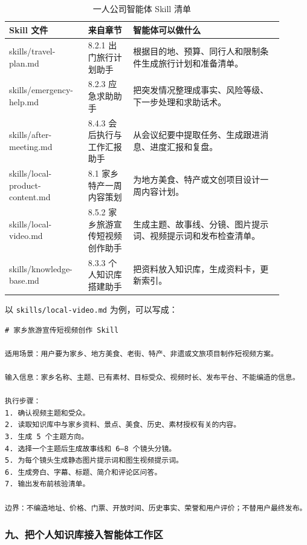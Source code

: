 \begin{table}[H]
\centering
\caption{一人公司智能体 Skill 清单}
\label{tab:oneperson-skill-list}
\begin{tabular}{p{0.25\linewidth} p{0.15\linewidth} p{0.50\linewidth}}
\toprule
\textbf{Skill 文件} & \textbf{来自章节} & \textbf{智能体可以做什么} \\
\midrule
skills/travel-plan.md & 8.2.1 出门旅行计划助手 & 根据目的地、预算、同行人和限制条件生成旅行计划和准备清单。 \\
skills/emergency-help.md & 8.2.3 应急求助助手 & 把突发情况整理成事实、风险等级、下一步处理和求助话术。 \\
skills/after-meeting.md & 8.4.3 会后执行与工作汇报助手 & 从会议纪要中提取任务、生成跟进消息、进度汇报和复盘。 \\
skills/local-product-content.md & 8.1 家乡特产一周内容策划 & 为地方美食、特产或文创项目设计一周内容计划。 \\
skills/local-video.md & 8.5.2 家乡旅游宣传短视频创作助手 & 生成主题、故事线、分镜、图片提示词、视频提示词和发布检查清单。 \\
skills/knowledge-base.md & 8.3.3 个人知识库搭建助手 & 把资料放入知识库，生成资料卡，更新索引。 \\
\bottomrule
\end{tabular}
\end{table}

以 \texttt{skills/local-video.md} 为例，可以写成：
\begin{verbatim}
# 家乡旅游宣传短视频创作 Skill

适用场景：用户要为家乡、地方美食、老街、特产、非遗或文旅项目制作短视频方案。

输入信息：家乡名称、主题、已有素材、目标受众、视频时长、发布平台、不能编造的信息。

执行步骤：
1. 确认视频主题和受众。
2. 读取知识库中与家乡资料、景点、美食、历史、素材授权有关的内容。
3. 生成 5 个主题方向。
4. 选择一个主题后生成故事线和 6—8 个镜头分镜。
5. 为每个镜头生成静态图片提示词和图生视频提示词。
6. 生成旁白、字幕、标题、简介和评论区问答。
7. 输出发布前核验清单。

边界：不编造地址、价格、门票、开放时间、历史事实、荣誉和用户评价；不替用户最终发布。
\end{verbatim}


\subsubsection*{九、把个人知识库接入智能体工作区}

